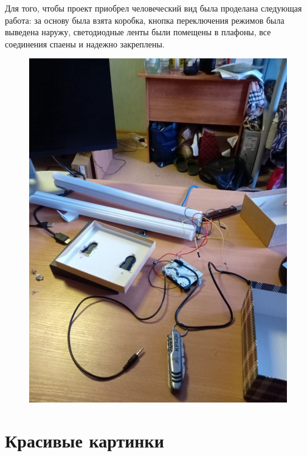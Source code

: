 \documentclass[a4paper, 12pt]{article}%
\begin{document}
Для того, чтобы проект приобрел человеческий вид была проделана следующая работа: за основу была взята коробка, кнопка переключения режимов была выведена наружу, светодиодные ленты были помещены в плафоны, все соединения спаены и надежно закреплены.


\begin{figure}[!h]
\begin{center}
\includegraphics[scale=0.4]{pictures/work1.png}
\end{center}
\end{figure}

\section{Красивые картинки}
\end{document}
